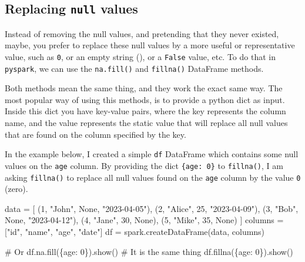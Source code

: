 \documentclass[
  11pt,
  letterpaper,
  DIV=11,
  numbers=noendperiod]{scrreprt}
\newenvironment{Shaded}{\begin{snugshade}}{\end{snugshade}}
\newcommand{\CommentTok}[1]{\textcolor[rgb]{0.37,0.37,0.37}{#1}}
\newcommand{\DecValTok}[1]{\textcolor[rgb]{0.68,0.00,0.00}{#1}}
\newcommand{\NormalTok}[1]{\textcolor[rgb]{0.00,0.23,0.31}{#1}}
\newcommand{\OperatorTok}[1]{\textcolor[rgb]{0.37,0.37,0.37}{#1}}
\newcommand{\StringTok}[1]{\textcolor[rgb]{0.13,0.47,0.30}{#1}}
\newcommand{\VariableTok}[1]{\textcolor[rgb]{0.07,0.07,0.07}{#1}}
\begin{document}
\hypertarget{replacing-null-values}{%
\subsection{\texorpdfstring{Replacing \texttt{null}
values}{Replacing null values}}\label{replacing-null-values}}

Instead of removing the null values, and pretending that they never
existed, maybe, you prefer to replace these null values by a more useful
or representative value, such as \texttt{0}, or an empty string
(\texttt{\textquotesingle{}\textquotesingle{}}), or a \texttt{False}
value, etc. To do that in \texttt{pyspark}, we can use the
\texttt{na.fill()} and \texttt{fillna()} DataFrame methods.

Both methods mean the same thing, and they work the exact same way. The
most popular way of using this methods, is to provide a python dict as
input. Inside this dict you have key-value pairs, where the key
represents the column name, and the value represents the static value
that will replace all null values that are found on the column specified
by the key.

In the example below, I created a simple \texttt{df} DataFrame which
contains some null values on the \texttt{age} column. By providing the
dict \texttt{\{\textquotesingle{}age\textquotesingle{}:\ 0\}} to
\texttt{fillna()}, I am asking \texttt{fillna()} to replace all null
values found on the \texttt{age} column by the value \texttt{0} (zero).

\begin{Shaded}
\begin{Highlighting}[]
\NormalTok{data }\OperatorTok{=}\NormalTok{ [}
\NormalTok{    (}\DecValTok{1}\NormalTok{, }\StringTok{"John"}\NormalTok{, }\VariableTok{None}\NormalTok{, }\StringTok{"2023{-}04{-}05"}\NormalTok{),}
\NormalTok{    (}\DecValTok{2}\NormalTok{, }\StringTok{"Alice"}\NormalTok{, }\DecValTok{25}\NormalTok{, }\StringTok{"2023{-}04{-}09"}\NormalTok{),}
\NormalTok{    (}\DecValTok{3}\NormalTok{, }\StringTok{"Bob"}\NormalTok{, }\VariableTok{None}\NormalTok{, }\StringTok{"2023{-}04{-}12"}\NormalTok{),}
\NormalTok{    (}\DecValTok{4}\NormalTok{, }\StringTok{"Jane"}\NormalTok{, }\DecValTok{30}\NormalTok{, }\VariableTok{None}\NormalTok{),}
\NormalTok{    (}\DecValTok{5}\NormalTok{, }\StringTok{"Mike"}\NormalTok{, }\DecValTok{35}\NormalTok{, }\VariableTok{None}\NormalTok{)}
\NormalTok{]}
\NormalTok{columns }\OperatorTok{=}\NormalTok{ [}\StringTok{"id"}\NormalTok{, }\StringTok{"name"}\NormalTok{, }\StringTok{"age"}\NormalTok{, }\StringTok{"date"}\NormalTok{]}
\NormalTok{df }\OperatorTok{=}\NormalTok{ spark.createDataFrame(data, columns)}

\CommentTok{\# Or \textasciigrave{}df.na.fill(\{\textquotesingle{}age\textquotesingle{}: 0\}).show()\textasciigrave{}}
\CommentTok{\# It is the same thing}
\NormalTok{df.fillna(\{}\StringTok{\textquotesingle{}age\textquotesingle{}}\NormalTok{: }\DecValTok{0}\NormalTok{\}).show()}
\end{Highlighting}
\end{Shaded}
\end{document}
